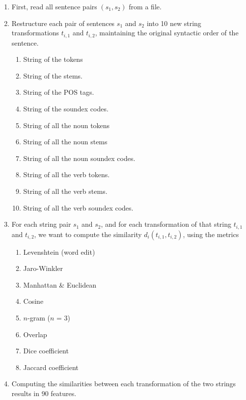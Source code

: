 \documentclass[11pt, reqno]{amsart}
\begin{document}
	\begin{enumerate}
	\item First, read all sentence pairs $(s_1, s_2)$ from a file.
	\item Restructure each pair of sentences $s_1$ and $s_2$ into 10 new string transformations $t_{i,1}$ and $t_{i,2}$, maintaining the original syntactic order of the sentence.
		\begin{multicols}{2}
		\begin{enumerate}
			\item String of the tokens
			\item String of the stems.
			\item String of the POS tags.
			\item String of the soundex codes\cite{soundex}.
			\item String of all the noun tokens
			\item String of all the noun stems
			\item String of all the noun soundex codes.
			\item String of all the verb tokens.
			\item String of all the verb stems.
			\item String of all the verb soundex codes.
		\end{enumerate}
		\end{multicols}
	\item For each string pair $s_1$ and $s_2$, and for each transformation of that string $t_{i,1}$ and $t_{i,2}$, we want to compute the similarity\cite{malakasiotis2007learning} $d_i(t_{i,1},t_{i,2})$, using the metrics 
		\begin{multicols}{2}
		\begin{enumerate}
		\item Levenshtein (word edit)
		\item Jaro-Winkler
		\item Manhattan \& Euclidean
		\item Cosine
		\item $n$-gram ($n$ = 3)
		\item Overlap
		\item Dice coefficient
		\item Jaccard coefficient 
		\end{enumerate}
		\end{multicols}
	\item Computing the similarities between each transformation of the two strings results in 90 features. 

\end{enumerate}
\end{document}
